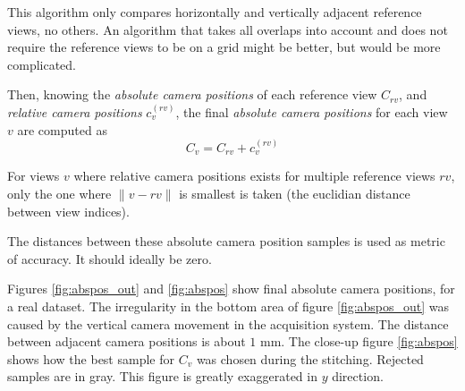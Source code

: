 \documentclass[11pt]{scrreprt}
\begin{document}
This algorithm only compares horizontally and vertically adjacent reference views, no others. An algorithm that takes all overlaps into account and does not require the reference views to be on a grid might be better, but would be more complicated.

Then, knowing the \emph{absolute camera positions} of each reference view $C_{rv}$, and \emph{relative camera positions} $c^{(rv)}_{v}$, the final \emph{absolute camera positions} for each view $v$ are computed as
\begin{equation*}
C_{v} = C_{rv} + c^{(rv)}_{v}
\end{equation*}

\noindent For views $v$ where relative camera positions exists for multiple reference views $rv$, only the one where $\| v - rv \|$ is smallest is taken (the euclidian distance between view indices).

The distances between these absolute camera position samples is used as metric of accuracy. It should ideally be zero.

Figures \ref{fig:abspos_out} and \ref{fig:abspos} show final absolute camera positions, for a real dataset. The irregularity in the bottom area of figure \ref{fig:abspos_out} was caused by the vertical camera movement in the acquisition system. The distance between adjacent camera positions is about $1\text{ mm}$. The close-up figure \ref{fig:abspos} shows how the best sample for $C_v$ was chosen during the stitching. Rejected samples are in gray. This figure is greatly exaggerated in $y$ direction.
\end{document}
